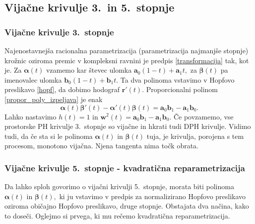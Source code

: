 \documentclass[12pt,a4paper,twoside]{article}
\theoremstyle{definition} %
\theoremstyle{plain} %
\numberwithin{equation}{section}  %
\newcommand{\aV}{\mathbf{a}}
\newcommand{\bV}{\mathbf{b}}
\newcommand{\rV}{\mathbf{r}}
\newcommand{\wV}{\mathbf{w}}
\newcommand{\balpha}{\boldsymbol \alpha}
\newcommand{\bbeta}{\boldsymbol \beta}
\begin{document}
\subsection{Vijačne krivulje 3.\ in 5.\ stopnje}

\subsubsection{Vijačne krivulje 3.\ stopnje}

Najenostavnejša racionalna parametrizacija (parametrizacija najmanjše stopnje)\\krožnic oziroma premic v kompleksni ravnini je predpis \eqref{transformacija} tak, kot je. Za $\balpha(t)$ vzamemo kar števec ulomka $\aV_0(1-t)+\aV_1t,$ za $\bbeta(t)$ pa imenovalec ulomka $\bV_0(1-t)+\bV_1t.$ Ta dva polinoma vstavimo v Hopfovo preslikavo \eqref{hopf}, da dobimo hodograf $\rV'(t).$ Proporcionalni polinom \eqref{propor_poly_izpeljava} je enak
\begin{equation*}
	\balpha(t)\bbeta'(t)-\balpha'(t)\bbeta(t)=\aV_0\bV_1-\aV_1\bV_0.
\end{equation*}
Lahko nastavimo $h(t)=1$ in $\wV^2(t)=\aV_0\bV_1-\aV_1\bV_0.$ Če povzamemo, vse prostorske PH krivulje 3.\ stopnje so vijačne in hkrati tudi DPH krivulje. Vidimo tudi, da če sta si le polinoma $\balpha(t)$ in $\bbeta(t)$ tuja, je krivulja, porojena s tem procesom, monotono vijačna. Njena tangenta nima točk obrata.

\subsubsection{Vijačne krivulje 5.\ stopnje - kvadratična reparametrizacija}
\label{kvadraticna_reparametrizacija_5}

Da lahko sploh govorimo o vijačni krivulji 5.\ stopnje, morata biti polinoma $\balpha(t)$ in $\bbeta(t),$ ki ju vstavimo v predpis za normalizirano Hopfovo preslikavo oziroma običajno Hopfovo preslikavo, druge stopnje. Obstajata dva načina, kako to doseči. Oglejmo si prvega, ki mu rečemo kvadratična reparametrizacija.
\end{document}
